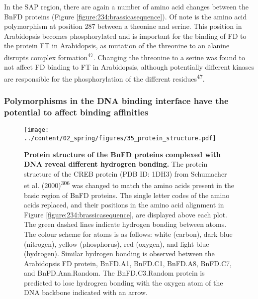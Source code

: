 \documentclass[12pt,]{book}
\begin{document}
In the SAP region, there are again a number of amino acid changes
between the BnFD proteins (Figure \ref{figure:234:brassicasequence}). Of
note is the amino acid polymorphism at position 287 between a theonine
and serine. This position in Arabidopsis becomes phosphorylated and is
important for the binding of FD to the protein FT in Arabidopsis, as
mutation of the threonine to an alanine disrupts complex
formation\textsuperscript{47}. Changing the threonine to a serine was
found to not affect FD binding to FT in Arabidopsis, although
potentially different kinases are responsible for the phosphorylation of
the different residues\textsuperscript{47}.

\subsubsection{Polymorphisms in the DNA binding interface have the
potential to affect binding
affinities}\label{section:spring:fddnabinding}

\begin{figure}[htbp]
\centering
\texttt{[image: ../content/02\_spring/figures/35\_protein\_structure.pdf]}
\caption{\textbf{Protein structure of the BnFD proteins complexed with
DNA reveal different hydrogren bonding.} The protein structure of the
CREB protein (PDB ID: 1DH3) from Schumacher et al.
(2000)\textsuperscript{306} was changed to match the amino acids present
in the basic region of BnFD proteins. The single letter codes of the
amino acids replaced, and their positions in the amino acid alignment in
Figure \ref{figure:234:brassicasequence}, are displayed above each plot.
The green dashed lines indicate hydrogen bonding between atoms. The
colour scheme for atoms is as follows: white (carbon), dark blue
(nitrogen), yellow (phosphorus), red (oxygen), and light blue
(hydrogen). Similar hydrogen bonding is observed between the Arabidopsis
FD protein, BnFD.A1, BnFD.C1, BnFD.A8, BnFD.C7, and BnFD.Ann.Random. The
BnFD.C3.Random protein is predicted to lose hydrogren bonding with the
oxygen atom of the DNA backbone indicated with an
arrow.}\label{figure:235:proteinstructure}
\end{figure}
\end{document}
